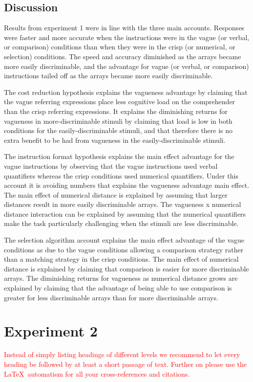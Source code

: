\subsection{Discussion}

Results from experiment 1 were in line with the three main accounts. Responses were faster and more accurate when the instructions were in the vague (or verbal, or comparison) conditions than when they were in the crisp (or numerical, or selection) conditions. The speed and accuracy diminished as the arrays became more easily discriminable, and the advantage for vague (or verbal, or comparison) instructions tailed off as the arrays became more easily discriminable.

The cost reduction hypothesis explains the vagueness advantage by claiming that the vague referring expressions place less cognitive load on the comprehender than the crisp referring expressions. It explains the diminishing returns for vagueness in more-discriminable stimuli by claiming that load is low in both conditions for the easily-discriminable stimuli, and that therefore there is no extra benefit to be had from vagueness in the easily-discriminable stimuli. 

The instruction format hypothesis explains the main effect advantage for the vague instructions by observing that the vague instructions used verbal quantifiers whereas the crisp conditions used numerical quantifiers. Under this account it is avoiding numbers that explains the vagueness advantage main effect. The main effect of numerical distance is explained by assuming that larger distances result in more easily discriminable arrays. The vagueness x numerical distance interaction can be explained by assuming that the numerical quantifiers make the task particularly challenging when the stimuli are less discriminable.

The selection algorithm account explains the main effect advantage of the vague conditions as due to the vague conditions allowing a comparison strategy rather than a matching strategy in the crisp conditions. The main effect of numerical distance is explained by claiming that comparison is easier for more discriminable arrays. The diminishing returns for vagueness as numerical distance grows are explained by claiming that the advantage of being able to use comparison is greater for less discriminable arrays than for more discriminable arrays.


\section{Experiment 2}
\label{sec:3}
\textcolor{red}{Instead of simply listing headings of different levels we recommend to let every heading be followed by at least a short passage of text. Further on please use the \LaTeX\ automatism for all your cross-references and citations.}


